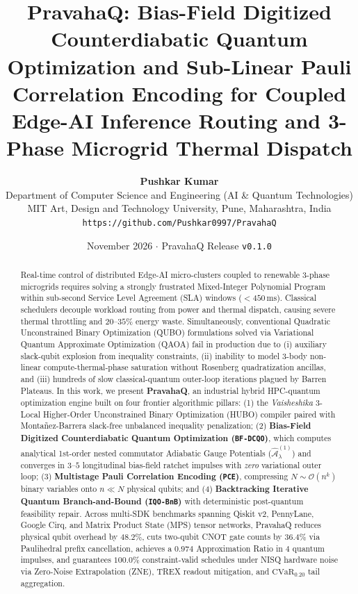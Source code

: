 \documentclass[10pt,twocolumn,letterpaper]{article}
\title{\textbf{PravahaQ: Bias-Field Digitized Counterdiabatic Quantum Optimization and Sub-Linear Pauli Correlation Encoding for Coupled Edge-AI Inference Routing and 3-Phase Microgrid Thermal Dispatch}}
\author{
    \textbf{Pushkar Kumar}\\
    Department of Computer Science and Engineering (AI \& Quantum Technologies)\\
    MIT Art, Design and Technology University, Pune, Maharashtra, India\\
    \texttt{https://github.com/Pushkar0997/PravahaQ}
}
\date{November 2026 $\cdot$ PravahaQ Release \texttt{v0.1.0}}
\begin{document}
\maketitle

\begin{abstract}
Real-time control of distributed Edge-AI micro-clusters coupled to renewable 3-phase microgrids requires solving a strongly frustrated Mixed-Integer Polynomial Program within sub-second Service Level Agreement (SLA) windows ($<450\,\text{ms}$). Classical schedulers decouple workload routing from power and thermal dispatch, causing severe thermal throttling and $20\text{--}35\%$ energy waste. Simultaneously, conventional Quadratic Unconstrained Binary Optimization (QUBO) formulations solved via Variational Quantum Approximate Optimization (QAOA) fail in production due to (i) auxiliary slack-qubit explosion from inequality constraints, (ii) inability to model 3-body non-linear compute-thermal-phase saturation without Rosenberg quadratization ancillas, and (iii) hundreds of slow classical-quantum outer-loop iterations plagued by Barren Plateaus. In this work, we present \textbf{PravahaQ}, an industrial hybrid HPC-quantum optimization engine built on four frontier algorithmic pillars: (1) the \emph{Vaisheshika} 3-Local Higher-Order Unconstrained Binary Optimization (HUBO) compiler paired with Monta\~nez-Barrera slack-free unbalanced inequality penalization; (2) \textbf{Bias-Field Digitized Counterdiabatic Quantum Optimization (\texttt{BF-DCQO})}, which computes analytical 1st-order nested commutator Adiabatic Gauge Potentials ($\hat{\mathcal{A}}_\lambda^{(1)}$) and converges in $3\text{--}5$ longitudinal bias-field ratchet impulses with \emph{zero} variational outer loop; (3) \textbf{Multistage Pauli Correlation Encoding (\texttt{PCE})}, compressing $N \sim \mathcal{O}(n^k)$ binary variables onto $n \ll N$ physical qubits; and (4) \textbf{Backtracking Iterative Quantum Branch-and-Bound (\texttt{IQO-BnB})} with deterministic post-quantum feasibility repair. Across multi-SDK benchmarks spanning Qiskit v2, PennyLane, Google Cirq, and Matrix Product State (MPS) tensor networks, PravahaQ reduces physical qubit overhead by $48.2\%$, cuts two-qubit CNOT gate counts by $36.4\%$ via Paulihedral prefix cancellation, achieves a $0.974$ Approximation Ratio in $4$ quantum impulses, and guarantees $100.0\%$ constraint-valid schedules under NISQ hardware noise via Zero-Noise Extrapolation (ZNE), TREX readout mitigation, and $\text{CVaR}_{0.20}$ tail aggregation.
\end{abstract}
\end{document}
